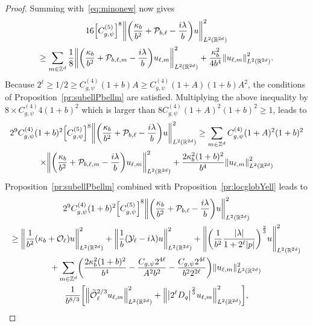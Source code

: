 \documentclass[AHL,Unicode,longabstracts]{cedram}
\newcommand{\Z}{\mathbb{Z}}
\newcommand{\R}{\mathbb{R}}
\newcommand{\clY}{\mathcal{Y}}
\newcommand{\clO}{\mathcal{O}}
\newcommand{\clP}{\mathcal{P}}
\newcommand\norm[1]{\left\lVert#1\right\rVert}
\let\oldtilde\tilde
\renewcommand*{\tilde}[1]{\mathchoice{\widetilde{#1}}{\widetilde{#1}}{\oldtilde{#1}}{\oldtilde{#1}}}
\let\originalleft\left
\let\originalright\right
\renewcommand{\left}{\mathopen{}\mathclose\bgroup\originalleft}
\renewcommand{\right}{\aftergroup\egroup\originalright}
\begin{document}
\begin{proof}
Summing with~\eqref{eq:minonew} now gives
\begin{multline*}
16 \left[C_{g,\psi}^{(5)}\right]^{8} \left\| \left(\frac{\kappa_{b}}{b^{2}}+\clP_{b,\ell} - \frac{i\lambda}{b}\right) u \right\|^{2}_{L^2(\R^{2d})} \\
\geq
\sum_{m\in \Z^d}\frac{1}{8}\left\| \left(\frac{\kappa_{b}}{b^{2}}+\clP_{b,\ell,m} - \frac{i\lambda}{b}\right) u_{\ell,m}\right\|^{2}_{L^2(\R^{2d})}
+\frac{\kappa_{b}^{2}}{4b^4}\norm{u_{\ell,m}}_{L^2(\R^{2d})}^2.
\end{multline*}
Because $2^{\ell}\geq 1/2\geq C_{g,\psi}^{(4)}(1+b)A\geq C_{g,\psi}^{(4)}(1+A)(1+b)A^{2}$, the conditions of Proposition~\ref{pr:subellPbellm} are satisfied. Multiplying the above inequality by $8\times C_{g,\psi}^{(4)}4(1+b)^{2}$ which is larger than $8 C_{g,\psi}^{(4)}(1+A)^{2}(1+b)^{2}\geq 1$, leads to
\begin{multline*}
2^{9} C_{g,\psi}^{(4)}(1+b)^{2}\left[C_{g,\psi}^{(5)}\right]^{8} \left\| \left(\frac{\kappa_{b}}{b^{2}}+\clP_{b,\ell} - \frac{i\lambda}{b}\right) u \right\|^{2}_{L^2(\R^{2d})}
\geq
\sum_{m\in \Z^d}C_{g,\psi}^{(4)}(1+A)^{2}(1+b)^{2}\\\times\left\| \left(\frac{\kappa_{b}}{b^{2}}+\clP_{b,\ell,m} - \frac{i\lambda}{b}\right) u_{\ell,m}\right\|^{2}_{L^2(\R^{2d})}
+\frac{2\kappa_{b}^{2}(1+b)^{2}}{b^4}\norm{u_{\ell,m}}_{L^2(\R^{2d})}^2
\end{multline*}
Proposition~\ref{pr:subellPbellm} combined with Proposition~\ref{pr:locglobYell} leads to
\begingroup
\allowdisplaybreaks
\begin{multline*}
2^{9} C_{g,\psi}^{(4)}(1+b)^{2}\left[C_{g,\psi}^{(5)}\right]^{8} \left\|\left(\frac{\kappa_{b}}{b^{2}}+\clP_{b,\ell} - \frac{i\lambda}{b}\right) u \right\|^{2}_{L^2(\R^{2d})}
\\
\geq\left\|\frac{1}{b^{2}}(\kappa_{b}+\clO_{\ell})u\right\|_{L^{2}(\R^{2d})}^{2} +\left\|\frac{1}{b}(\clY_{\ell}-i\lambda)u\right\|_{L^{2}(\R^{2d})}^{2} +\left\| \left(\frac{1}{b^2} \frac{|\lambda|}{1+2^{\ell}|p|} \right)^{\frac{2}{3}} u \right\|_{L^2(\R^{2d})}^{2}\\
+\sum_{m\in\Z^{d}}\left(\frac{2\kappa_{b}^{2}(1+b)^{2}}{b^{4}} -\frac{C_{g,\psi}2^{4\ell}}{A^{2}b^{2}}-\frac{C_{g,\psi}2^{4\ell}}{b^{2}2^{2\ell}}\right)
\|u_{\ell,m}\|_{L^{2}(\R^{2d})}^{2}
\\
\frac{1}{b^{8/3}}\left[
\left\|\tilde{\clO}_{\ell}^{2/3} u_{\ell,m}\right\|_{L^2(\R^{2d})}^2+ \left\|\left|2^{\ell}D_{q} \right|^{\frac{2}{3}} u_{\ell,m} \right\|_{L^2(\R^{2d})}^{2}\right],
\end{multline*}

\end{proof}
\end{document}
